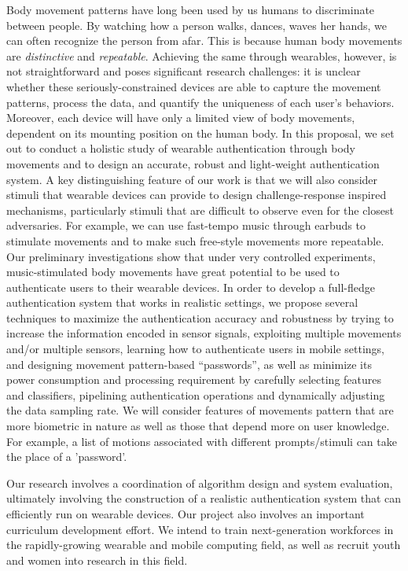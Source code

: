 Body movement patterns have long been used by us humans to discriminate between people. By watching how a person walks, dances, waves her hands, we can often recognize the person from afar. This is because human body movements are \emph{distinctive} and \emph{repeatable}.  Achieving the same through wearables, however, is not straightforward and poses significant research challenges: it is unclear whether these seriously-constrained devices are able to capture the movement patterns, process the data, and quantify the uniqueness of each user's behaviors. Moreover, each device will have only a limited view of body movements, dependent on its mounting position on the human body. In this proposal, we set out to conduct a holistic study of wearable authentication through body movements and to design an accurate, robust and light-weight authentication system. A key distinguishing feature of our work is that we will also consider stimuli that wearable devices can provide to design challenge-response inspired mechanisms, particularly stimuli that are difficult to observe even for the closest adversaries. For example, we can use fast-tempo music through earbuds to stimulate movements and to make such free-style movements more repeatable. Our preliminary investigations show that under very controlled experiments, music-stimulated body movements have great potential to be used to authenticate users to their wearable devices. In order to develop a full-fledge authentication system that works in realistic settings, we propose several techniques to maximize the authentication accuracy and robustness by trying to increase the information encoded in sensor signals, exploiting multiple movements and/or multiple sensors, learning how to authenticate users in mobile settings, and designing movement pattern-based ``passwords'', as well as minimize its power consumption and processing requirement by carefully selecting features and classifiers, pipelining authentication operations and dynamically adjusting the data sampling rate. We will consider features of movements pattern that are more biometric in nature as well as those that depend more on user knowledge. For example, a list of motions associated with different prompts/stimuli can take the place of a 'password'.

Our research involves a coordination of algorithm design and system evaluation, ultimately involving the construction of a realistic authentication system that can efficiently run on wearable devices. Our project also involves an important curriculum development effort. We intend to train next-generation workforces in the rapidly-growing wearable and mobile computing field, as well as recruit youth and women into research in this field.


